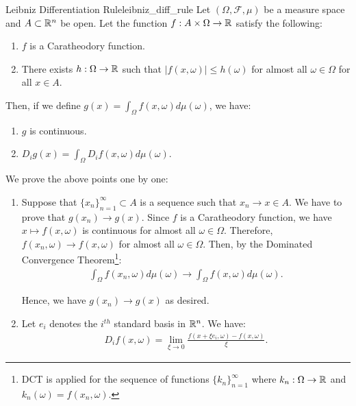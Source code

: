 \begin{proposition}{Leibniz Differentiation Rule}{leibniz_diff_rule}
	Let $(\Omega, \mathcal{F}, \mu)$ be a measure space and $A\subset\mathbb{R}^n$ be open. Let the function $f: A\times\Omega\to\mathbb{R}$ satisfy the following:
	\begin{enumerate}
		\item $f$ is a Caratheodory function.
		\item There exists $h: \Omega\to\mathbb{R}$ such that $|f(x, \omega)|\le h(\omega)$ for almost all $\omega\in\Omega$ for all $x\in A$.
	\end{enumerate}

	\noindent Then, if we define $g(x) = \int_\Omega f(x, \omega)d\mu(\omega)$, we have:
	\begin{enumerate}[label=(\roman*)]
		\item $g$ is continuous.
		\item $D_i g(x) = \int_\Omega D_i f(x, \omega)d\mu(\omega)$.
	\end{enumerate} 
\end{proposition} 

\begin{proof*}
	We prove the above points one by one:
	\begin{enumerate}[label=(\roman*)]
		\item Suppose that $\{x_n\}_{n=1}^\infty\subset A$ is a sequence such that $x_n\to x\in A$. We have to prove that $g(x_n)\to g(x)$. Since $f$ is a Caratheodory function, we have $x\mapsto f(x, \omega)$ is continuous for almost all $\omega\in\Omega$. Therefore, $f(x_n,\omega)\to f(x, \omega)$ for almost all $\omega\in\Omega$. Then, by the Dominated Convergence Theorem\footnote{DCT is applied for the sequence of functions $\{k_n\}_{n=1}^\infty$ where $k_n:\Omega\to\mathbb{R}$ and $k_n(\omega)=f(x_n, \omega)$.}:
		\begin{align*}
			\int_\Omega f(x_n, \omega) d\mu(\omega) \to \int_\Omega f(x, \omega)d\mu(\omega).	
		\end{align*} 

		\noindent Hence, we have $g(x_n) \to g(x)$ as desired.

		\item Let $e_i$ denotes the $i^{th}$ standard basis in $\mathbb{R}^n$. We have:
		\begin{align*}
			D_i f(x, \omega) = \lim_{\xi\to 0} \frac{f(x+\xi e_i, \omega) - f(x, \omega)}{\xi}.
		\end{align*} 
	\end{enumerate} 	
\end{proof*} 
